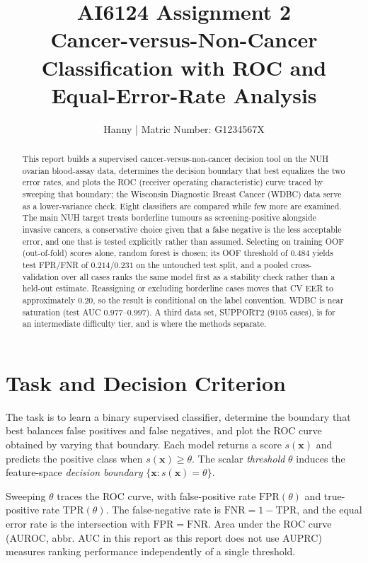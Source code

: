 \documentclass[11pt,a4paper]{article}
\title{AI6124 Assignment 2 \\ \large Cancer-versus-Non-Cancer Classification with ROC and Equal-Error-Rate Analysis}
\author{Hanny | Matric Number: G1234567X}
\begin{document}
\maketitle

\begin{abstract}
This report builds a supervised cancer-versus-non-cancer decision tool on the NUH ovarian blood-assay data, determines the decision boundary that best equalizes the two error rates, and plots the ROC (receiver operating characteristic) curve traced by sweeping that boundary; the Wisconsin Diagnostic Breast Cancer (WDBC) data serve as a lower-variance check. Eight classifiers are compared while few more are examined. The main NUH target treats borderline tumours as screening-positive alongside invasive cancers, a conservative choice given that a false negative is the less acceptable error, and one that is tested explicitly rather than assumed. Selecting on training OOF (out-of-fold) scores alone, random forest is chosen; its OOF threshold of $0.484$ yields test FPR/FNR of $0.214/0.231$ on the untouched test split, and a pooled cross-validation over all cases ranks the same model first as a stability check rather than a held-out estimate. Reassigning or excluding borderline cases moves that CV EER to approximately $0.20$, so the result is conditional on the label convention. WDBC is near saturation (test AUC $0.977$--$0.997$). A third data set, SUPPORT2 (9105 cases), is for an intermediate difficulty tier, and is where the methods separate.
\end{abstract}

\section{Task and Decision Criterion}
The task is to learn a binary supervised classifier, determine the boundary that best balances false positives and false negatives, and plot the ROC curve obtained by varying that boundary. Each model returns a score $s(\mathbf{x})$ and predicts the positive class when $s(\mathbf{x})\ge\theta$. The scalar \emph{threshold} $\theta$ induces the feature-space \emph{decision boundary} $\{\mathbf{x}:s(\mathbf{x})=\theta\}$.

Sweeping $\theta$ traces the ROC curve, with false-positive rate $\mathrm{FPR}(\theta)$ and true-positive rate $\mathrm{TPR}(\theta)$. The false-negative rate is $\mathrm{FNR}=1-\mathrm{TPR}$, and the equal error rate is the intersection with $\mathrm{FPR}=\mathrm{FNR}$. Area under the ROC curve (AUROC, abbr. AUC in this report as this report does not use AUPRC) measures ranking performance independently of a single threshold.
\end{document}
